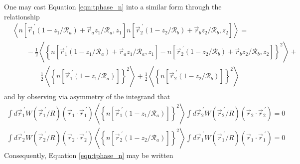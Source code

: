 One may cast Equation \ref{eqn:tphase_n} into a similar form through the relationship
\begin{equation}
\begin{aligned}
&  \left\langle n\left[\vec{r}^{\;\prime}_{1}\left(1-z_{1}/\mathcal{R}_{a}\right) + \vec{r}_{a} z_{1}/\mathcal{R}_{a}, z_{1}\right]
n\left[\vec{r}^{\;\prime}_{2}\left(1-z_{2}/\mathcal{R}_{b}\right) + \vec{r}_{b} z_{2}/\mathcal{R}_{b}, z_{2}\right] \right\rangle = \\
& \quad\quad -\frac{1}{2}\left\langle \left\{ n\left[\vec{r}^{\;\prime}_{1}\left(1-z_{1}/\mathcal{R}_{a}\right) + \vec{r}_{a} z_{1}/\mathcal{R}_{a}, z_{1}\right] - 
 n\left[\vec{r}^{\;\prime}_{2}\left(1-z_{2}/\mathcal{R}_{b}\right) + \vec{r}_{b} z_{2}/\mathcal{R}_{b}, z_{2}\right]\right\}^{2} \right\rangle + \\
&\quad\quad\quad\quad \frac{1}{2}\left\langle \left\{ n\left[\vec{r}^{\;\prime}_{1}\left(1-z_{1}/\mathcal{R}_{a}\right)\right]\right\}^{2}\right\rangle + 
\frac{1}{2}\left\langle \left\{ n\left[\vec{r}^{\;\prime}_{2}\left(1-z_{2}/\mathcal{R}_{b}\right)\right]\right\}^{2}\right\rangle \\
\end{aligned}
\end{equation}
and by observing via asymmetry of the integrand that
\begin{equation}\label{eqn:intzero}
\begin{aligned}
\int d\vec{r}^{\;\prime}_{1} W\left(\vec{r}^{\;\prime}_{1}/R\right) \left(\vec{r}_{1}\cdot\vec{r}^{\;\prime}_{1}\right)
\left\langle \left\{ n\left[\vec{r}^{\;\prime}_{1}\left(1-z_{1}/\mathcal{R}_{a}\right)\right]\right\}^{2}\right\rangle
\int d\vec{r}^{\;\prime}_{2} W\left(\vec{r}^{\;\prime}_{2}/R\right) \left(\vec{r}_{2}\cdot\vec{r}^{\;\prime}_{2}\right) = 0 \\
\int d\vec{r}^{\;\prime}_{2} W\left(\vec{r}^{\;\prime}_{2}/R\right) \left(\vec{r}_{2}\cdot\vec{r}^{\;\prime}_{2}\right) 
\left\langle \left\{ n\left[\vec{r}^{\;\prime}_{2}\left(1-z_{2}/\mathcal{R}_{a}\right)\right]\right\}^{2}\right\rangle
\int d\vec{r}^{\;\prime}_{1} W\left(\vec{r}^{\;\prime}_{1}/R\right) \left(\vec{r}_{1}\cdot\vec{r}^{\;\prime}_{1}\right) = 0
\end{aligned}
\end{equation}
Consequently, Equation \ref{eqn:tphase_n} may be written 
